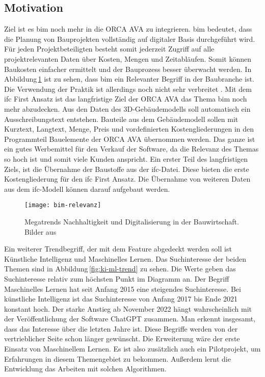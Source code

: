 \subsection{Motivation}
\label{c:intro:motivation}

Ziel ist es \ac{bim} noch mehr in die ORCA AVA zu integrieren. \ac{bim} bedeutet, dass die Planung von Bauprojekten vollständig auf digitaler Basis durchgeführt wird.  Für jeden Projektbeteiligten besteht somit jederzeit Zugriff auf alle projektrelevanten Daten über Kosten, Mengen und Zeitabläufen. Somit können Baukosten einfacher ermittelt und der Bauprozess besser überwacht werden. In Abbildung\,\ref{fig:bim} ist zu sehen, dass \ac{bim} ein Relevanter Begriff in der Baubranche ist. Die Verwendung der Praktik ist allerdings noch nicht sehr verbreitet \citep[p.~20]{Thomas_Baumanns_Dr_Philipp-Stephan_Freber_Dr_Kai-Stefan_Schober_Dr_Florian_Kirchner2016-gu}. Mit dem \glqq \ac{ifc} First\grqq{} Ansatz ist das langfristige Ziel der ORCA AVA das Thema \ac{bim} noch mehr abzudecken. Aus den Daten des 3D-Gebäudemodells soll automatisch ein Ausschreibungstext entstehen. Bauteile aus dem Gebäudemodell sollen mit Kurztext, Langtext, Menge, Preis und vordefinierten Kostengliederungen in den Programmteil Bauelemente der ORCA AVA übernommen werden. Das ganze ist ein gutes Werbemittel für den Verkauf der Software, da die Relevanz des Themas so hoch ist und somit viele Kunden anspricht. Ein erster Teil des langfristigen Ziels, ist die Übernahme der Baustoffe aus der \ac{ifc}-Datei. Diese bieten die erste Kostengliederung für den \glqq \ac{ifc} First\grqq{} Ansatz. Die Übernahme von weiteren Daten aus dem \ac{ifc}-Modell können darauf aufgebaut werden.
\begin{figure}[h]
	\centering
	\texttt{[image: bim-relevanz]}
	\caption[Relevanz \ac{bim}]
	{Megatrends Nachhaltigkeit und Digitalisierung in der Bauwirtschaft. Bilder aus \citep[p.~20]{Thomas_Baumanns_Dr_Philipp-Stephan_Freber_Dr_Kai-Stefan_Schober_Dr_Florian_Kirchner2016-gu}}
	\label{fig:bim}
\end{figure}
Ein weiterer Trendbegriff, der mit dem Feature abgedeckt werden soll ist \glqq Künstliche Intelligenz\grqq{} und \glqq Maschinelles Lernen\grqq{}. Das Suchinteresse der beiden Themen sind in Abbildung\,\ref{fig:ki-ml-trend} zu sehen. Die Werte geben das Suchinteresse relativ zum höchsten Punkt im Diagramm an. Der Begriff \glqq Maschinelles Lernen\grqq{} hat seit Anfang 2015 eine steigendes Suchinteresse. Bei \glqq künstliche Intelligenz\grqq{} ist das Suchinteresse von Anfang 2017 bis Ende 2021 konstant hoch. Der starke Anstieg ab November 2022 hängt wahrscheinlich mit der Veröffentlichung der Software ChatGPT zusammen. Man erkennt insgesamt, dass das Interesse über die letzten Jahre ist. Diese Begriffe werden von der vertrieblicher Seite schon länger gewünscht. Die Erweiterung wäre der erste Einsatz von Maschinellem Lernen. Es ist also zusätzlich auch ein Pilotprojekt, um Erfahrungen in diesem Themengebiet zu bekommen. Außerdem lernt die Entwicklung das Arbeiten mit solchen Algorithmen.

